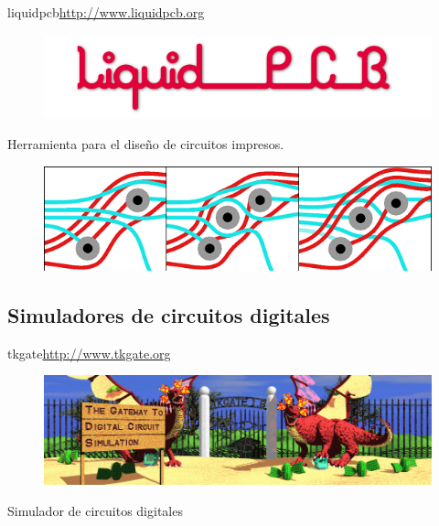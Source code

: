 \documentclass{beamer}
\begin{document}

\begin{frame}{liquidpcb}{\url{http://www.liquidpcb.org}}
  \begin{figure}[!h]
    \centering
    \includegraphics[scale=0.4]{img/liquidpcb.png}
  \end{figure}
  Herramienta para el diseño de circuitos impresos.
  \begin{figure}[!h]
    \centering
    \includegraphics[scale=0.5]{img/flexi.png}
  \end{figure}
\end{frame}

\subsection{Simuladores de circuitos digitales}

\begin{frame}{tkgate}{\url{http://www.tkgate.org}}
  \begin{figure}[!h]
    \centering
    \includegraphics[scale=0.35]{img/tkgate.png}
  \end{figure}
  Simulador de circuitos digitales
\end{frame}
\end{document}
